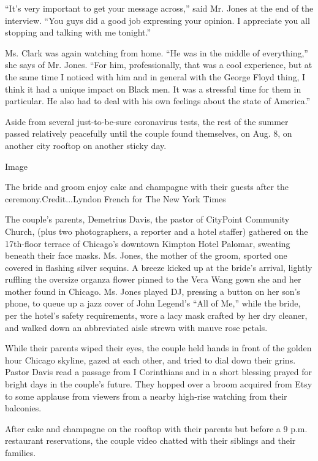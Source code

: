 ``It's very important to get your message across,'' said Mr. Jones at
the end of the interview. ``You guys did a good job expressing your
opinion. I appreciate you all stopping and talking with me tonight.''

Ms. Clark was again watching from home. ``He was in the middle of
everything,'' she says of Mr. Jones. ``For him, professionally, that was
a cool experience, but at the same time I noticed with him and in
general with the George Floyd thing, I think it had a unique impact on
Black men. It was a stressful time for them in particular. He also had
to deal with his own feelings about the state of America.''

Aside from several just-to-be-sure coronavirus tests, the rest of the
summer passed relatively peacefully until the couple found themselves,
on Aug. 8, on another city rooftop on another sticky day.

Image

The bride and groom enjoy cake and champagne with their guests after the
ceremony.Credit...Lyndon French for The New York Times

The couple's parents, Demetrius Davis, the pastor of CityPoint Community
Church, (plus two photographers, a reporter and a hotel staffer)
gathered on the 17th-floor terrace of Chicago's downtown Kimpton Hotel
Palomar, sweating beneath their face masks. Ms. Jones, the mother of the
groom, sported one covered in flashing silver sequins. A breeze kicked
up at the bride's arrival, lightly ruffling the oversize organza flower
pinned to the Vera Wang gown she and her mother found in Chicago. Ms.
Jones played DJ, pressing a button on her son's phone, to queue up a
jazz cover of John Legend's ``All of Me,'' while the bride, per the
hotel's safety requirements, wore a lacy mask crafted by her dry
cleaner, and walked down an abbreviated aisle strewn with mauve rose
petals.

While their parents wiped their eyes, the couple held hands in front of
the golden hour Chicago skyline, gazed at each other, and tried to dial
down their grins. Pastor Davis read a passage from I Corinthians and in
a short blessing prayed for bright days in the couple's future. They
hopped over a broom acquired from Etsy to some applause from viewers
from a nearby high-rise watching from their balconies.

After cake and champagne on the rooftop with their parents but before a
9 p.m. restaurant reservations, the couple video chatted with their
siblings and their families.

